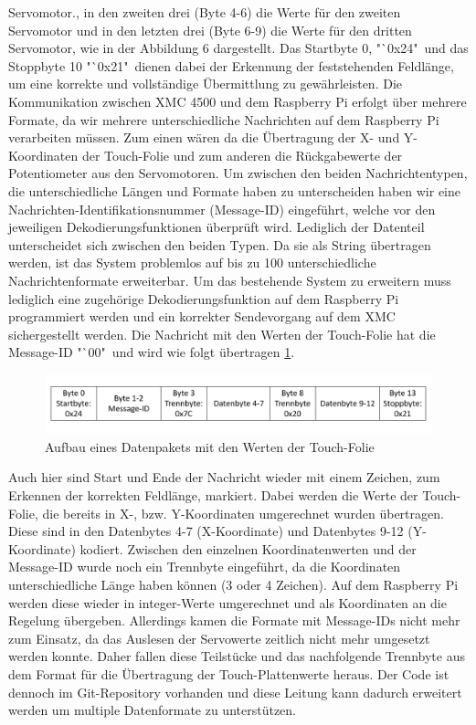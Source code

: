 \documentclass[12pt,a4paper,bibliography=totoc,listof=totoc]{scrartcl}
\begin{document}
Servomotor., in den zweiten drei (Byte 4-6) die Werte für den zweiten Servomotor und in den letzten drei 
(Byte 6-9) die Werte für den dritten Servomotor, wie in der Abbildung 6 dargestellt. Das Startbyte 0, 
"`0x24"\, und das Stoppbyte 10 "`0x21"\, dienen dabei der Erkennung der feststehenden Feldlänge, um eine korrekte 
und vollständige Übermittlung zu gewährleisten. Die Kommunikation zwischen XMC 4500 und dem Raspberry Pi 
erfolgt über mehrere Formate, da wir mehrere unterschiedliche Nachrichten auf dem Raspberry Pi verarbeiten 
müssen. Zum einen wären da die Übertragung der X- und Y-Koordinaten der Touch-Folie und zum anderen die 
Rückgabewerte der Potentiometer aus den Servomotoren. Um zwischen den beiden Nachrichtentypen, die 
unterschiedliche Längen und Formate haben zu unterscheiden haben wir eine Nachrichten-Identifikationsnummer 
(Message-ID) eingeführt, welche vor den jeweiligen Dekodierungsfunktionen überprüft wird. Lediglich der 
Datenteil unterscheidet sich zwischen den beiden Typen. Da sie als String übertragen werden, ist das 
System problemlos auf bis zu 100 unterschiedliche Nachrichtenformate erweiterbar. Um das bestehende System 
zu erweitern muss lediglich eine zugehörige Dekodierungsfunktion auf dem Raspberry Pi programmiert werden 
und ein korrekter Sendevorgang auf dem XMC sichergestellt werden. Die Nachricht mit den Werten der 
Touch-Folie hat die Message-ID "`00" \,und wird wie folgt übertragen \ref{fig:UART Platte}.
\begin{figure}[htbp]
	\centering
	\includegraphics[scale = 0.5]{pics/Uartplatte}
	\caption{Aufbau eines Datenpakets mit den Werten der Touch-Folie}
	\label{fig:UART Platte}
\end{figure}
Auch hier sind Start und Ende der Nachricht wieder mit einem Zeichen, zum Erkennen der korrekten 
Feldlänge, markiert. Dabei werden die Werte der Touch-Folie, die bereits in X-, bzw. Y-Koordinaten 
umgerechnet wurden übertragen. Diese sind in den Datenbytes 4-7 (X-Koordinate) und Datenbytes 9-12 
(Y-Koordinate) kodiert. Zwischen den einzelnen Koordinatenwerten und der Message-ID wurde noch ein 
Trennbyte eingeführt, da die Koordinaten unterschiedliche Länge haben können (3 oder 4 Zeichen). Auf dem 
Raspberry Pi werden diese wieder in integer-Werte umgerechnet und als Koordinaten an die Regelung 
übergeben.
\newline
Allerdings kamen die Formate mit Message-IDs nicht mehr zum Einsatz, da das Auslesen der Servowerte zeitlich 
nicht mehr umgesetzt werden konnte. Daher fallen diese Teilstücke und das nachfolgende Trennbyte aus dem 
Format für die Übertragung der Touch-Plattenwerte heraus. Der Code ist dennoch im Git-Repository vorhanden 
und diese Leitung kann dadurch erweitert werden um multiple Datenformate zu unterstützen.
\end{document}
